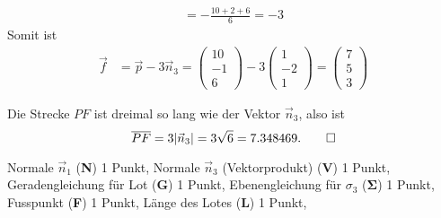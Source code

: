 \begin{loesung}
\begin{teilaufgaben}
\begin{align*}
=
-\frac{10+2+6}{6}=-3
\end{align*}
Somit ist
\begin{align*}
\vec f
&=
\vec p -3\vec n_3
=
\begin{pmatrix}10\\-1\\6\end{pmatrix}
-3
\begin{pmatrix}1\\-2\\1\end{pmatrix}
=
\begin{pmatrix}7\\5\\3\end{pmatrix}
\end{align*}
\item
Die Strecke $PF$ ist dreimal so lang wie der Vektor $\vec n_3$, also ist
\[
\overline{PF}
=
3|\vec n_3|
=
3\sqrt{6}
=
7.348469.
\qedhere
\]
\end{teilaufgaben}
\end{loesung}

\begin{bewertung}
Normale $\vec n_1$ ({\bf N}) 1 Punkt,
Normale $\vec n_3$ (Vektorprodukt) ({\bf V}) 1 Punkt,
Geradengleichung für Lot ({\bf G}) 1 Punkt,
Ebenengleichung für $\sigma_3$ ($\mathbf{\Sigma}$) 1 Punkt,
Fusspunkt ({\bf F}) 1 Punkt,
Länge des Lotes ({\bf L}) 1 Punkt,
\end{bewertung}


